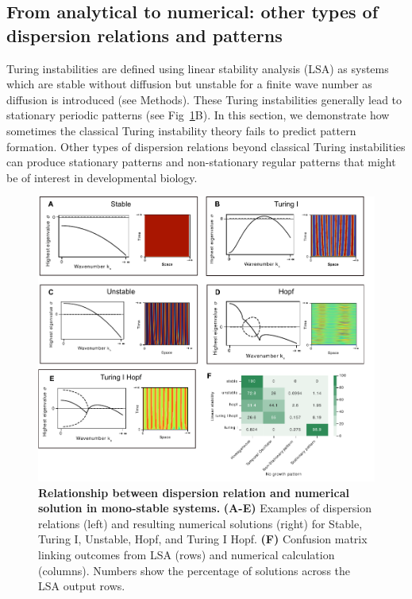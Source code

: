 \subsection*{From analytical to numerical: other types of dispersion relations and patterns} \label{nogrowth}

Turing instabilities are defined using linear stability analysis (LSA) as systems which are stable without diffusion but unstable for a finite wave number as diffusion is introduced (see Methods). These Turing instabilities generally lead to stationary periodic patterns (see Fig~\ref{fig:dispersions}B). In this section, we demonstrate how sometimes the classical Turing instability theory fails to predict pattern formation.
Other types of dispersion relations beyond classical Turing instabilities can produce stationary patterns and non-stationary regular patterns that might be of interest in developmental biology.

\begin{figure}[H]
    \includegraphics[width=1\textwidth]{figures/dispersion} %
    \caption{\textbf{Relationship between dispersion relation and numerical solution in mono-stable systems.} \textbf{(A-E)} Examples of dispersion relations (left) and resulting numerical solutions (right) for Stable, Turing I, Unstable, Hopf, and Turing I Hopf. \textbf{(F)} Confusion matrix linking outcomes from LSA (rows) and numerical calculation (columns). Numbers show the percentage of solutions across the LSA output rows.}
    \label{fig:dispersions} %
\end{figure}


